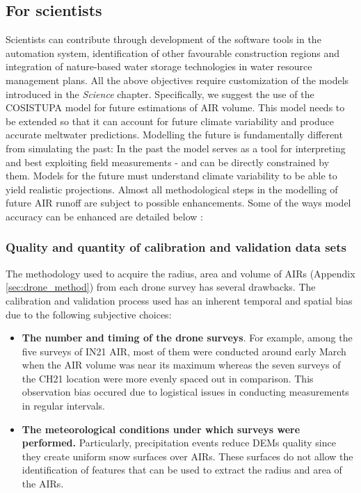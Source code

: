 \subsection{For scientists}

Scientists can contribute through development of the software tools in the automation system, identification of
other favourable construction regions and integration of nature-based water storage technologies in water
resource management plans. All the above objectives require customization of the models introduced in the
\textit{Science} chapter. Specifically, we suggest the use of the COSISTUPA model for future estimations of AIR
volume. This model needs to be extended so that it can account for future climate variability and produce
accurate meltwater predictions. Modelling the future is fundamentally different from simulating the past: In the
past the model serves as a tool for interpreting and best exploiting field measurements - and can be directly
constrained by them. Models for the future must understand climate variability to be able to yield realistic
projections. Almost all methodological steps in the modelling of future AIR runoff are subject to possible
enhancements. Some of the ways model accuracy can be enhanced are detailed below :

\subsubsection{Quality and quantity of calibration and validation data sets}

The methodology used to acquire the radius, area and volume of \ac{AIRs} (Appendix \ref{sec:drone_method}) from
each drone survey has several drawbacks. The calibration and validation process used has an inherent temporal
and spatial bias due to the following subjective choices:

\begin{itemize}
	\item \textbf{The number and timing of the drone surveys}. For example, among the five surveys of IN21 AIR, most of them were
	      conducted around early March when the AIR volume was near its maximum whereas the seven surveys of the CH21
	      location were more evenly spaced out in comparison. This observation bias occured due to logistical issues
	      in conducting measurements in regular intervals.

  \item \textbf{The meteorological conditions under which surveys were performed.} Particularly, precipitation
    events reduce \ac{DEMs} quality since they create uniform snow surfaces over \ac{AIRs}. These surfaces do
    not allow the identification of features that can be used to extract the radius and area of the \ac{AIRs}.

\end{itemize}

